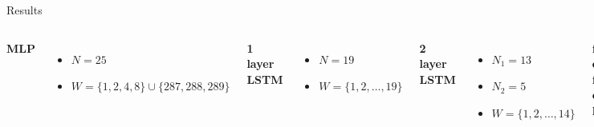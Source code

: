 \documentclass{beamer}
\begin{document}
  
  \begin{frame}{Results}
    \begin{columns}[c]
      \textbf{MLP}
      \begin{itemize}
	\item \(N=25\)
	\item \(W = \{1,2,4,8\} \cup \{287,288,289\}\)
      \end{itemize}
    
      \textbf{1 layer LSTM}
      \begin{itemize}
	\item \(N = 19\)
	\item \(W = \{1,2,\ldots,19\}\)
      \end{itemize}
      
      \textbf{2 layer LSTM}
      \begin{itemize}
	\item \(N_1 = 13\)
	\item \(N_2 = 5\)
	\item \(W = \{1,2,\ldots,14\}\)
      \end{itemize}
    
      \textbf{forecast error for different horizons}
      \begin{figure}
	\includegraphics[width=1.1\textwidth]{images/nn_errors.pdf}
      \end{figure}
    \end{columns}
  \end{frame}
  
\end{document}
